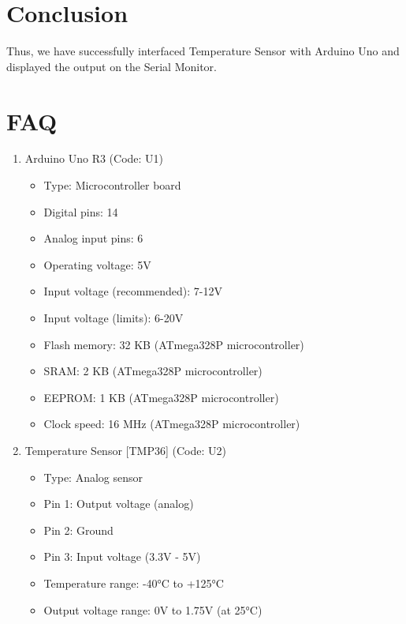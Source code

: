 \documentclass[11pt]{article}
\begin{document}
\section{Conclusion}
Thus, we have successfully interfaced Temperature Sensor with Arduino Uno and displayed the output on the Serial Monitor.
\clearpage

\section{FAQ}
\begin{enumerate}
	\item Arduino Uno R3 (Code: U1)
	      \begin{itemize}
		      \item Type: Microcontroller board
		      \item Digital pins: 14
		      \item Analog input pins: 6
		      \item Operating voltage: 5V
		      \item Input voltage (recommended): 7-12V
		      \item Input voltage (limits): 6-20V
		      \item Flash memory: 32 KB (ATmega328P microcontroller)
		      \item SRAM: 2 KB (ATmega328P microcontroller)
		      \item EEPROM: 1 KB (ATmega328P microcontroller)
		      \item Clock speed: 16 MHz (ATmega328P microcontroller)
	      \end{itemize}
	\item Temperature Sensor [TMP36] (Code: U2)
	      \begin{itemize}
		      \item Type: Analog sensor
		      \item Pin 1: Output voltage (analog)
		      \item Pin 2: Ground
		      \item Pin 3: Input voltage (3.3V - 5V)
		      \item Temperature range: -40°C to +125°C
		      \item Output voltage range: 0V to 1.75V (at 25°C)


\end{itemize}
\end{enumerate}
\end{document}
